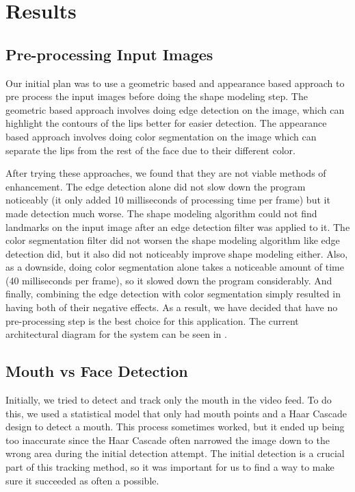 \chapter{Results}
\label{results}

\section{Pre-processing Input Images}
Our initial plan was to use a geometric based and appearance based approach to pre process the input images before doing the shape modeling step. The geometric based approach involves doing edge detection on the image, which can highlight the contours of the lips better for easier detection. The appearance based approach involves doing color segmentation on the image which can separate the lips from the rest of the face due to their different color. 

After trying these approaches, we found that they are not viable methods of enhancement. The edge detection alone did not slow down the program noticeably (it only added 10 milliseconds of processing time per frame) but it made detection much worse. The shape modeling algorithm could not find landmarks on the input image after an edge detection filter was applied to it. The color segmentation filter did not worsen the shape modeling algorithm like edge detection did, but it also did not noticeably improve shape modeling either. Also, as a downside, doing color segmentation alone takes a noticeable amount of time (40 milliseconds per frame), so it slowed down the program considerably. And finally, combining the edge detection with color segmentation simply resulted in having both of their negative effects. As a result, we have decided that have no pre-processing step is the best choice for this application. The current architectural diagram for the system can be seen in .

\section{Mouth vs Face Detection}
Initially, we tried to detect and track only the mouth in the video feed. To do this, we used a statistical model that only had mouth points and a Haar Cascade design to detect a mouth. This process sometimes worked, but it ended up being too inaccurate since the Haar Cascade often narrowed the image down to the wrong area during the initial detection attempt. The initial detection is a crucial part of this tracking method, so it was important for us to find a way to make sure it succeeded as often a possible.

